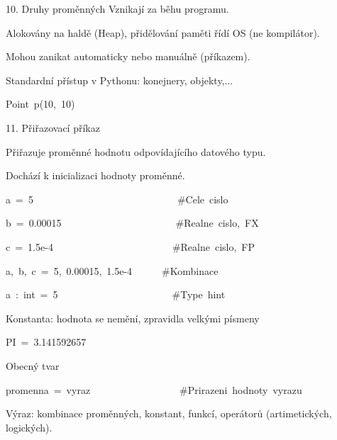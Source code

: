 \documentclass[czech]{beamer}
\newenvironment{lyxcode}
  {\par\begin{list}{}{
    \setlength{\rightmargin}{\leftmargin}
    \setlength{\listparindent}{0pt}%
    \raggedright
    \setlength{\itemsep}{0pt}
    \setlength{\parsep}{0pt}
    \normalfont\ttfamily}%
   \def\{{\char`\{}
   \def\}{\char`\}}
   \def\textasciitilde{\char`\~}
   \item[]}
  {\end{list}}
\begin{document}
\begin{frame}[plain]{10. Druhy proměnných}
{\tiny Vznikají za běhu programu.}{\tiny\par}

{\tiny Alokovány na haldě (Heap), přidělování paměti řídí OS (ne kompilátor). }{\tiny\par}

{\tiny Mohou zanikat automaticky nebo manuálně (příkazem).}{\tiny\par}

{\tiny Standardní přístup v Pythonu: konejnery, objekty,...}{\tiny\par}
\begin{lyxcode}
{\tiny Point~p(10,~10)}{\tiny\par}
\end{lyxcode}
\end{frame}

\begin{frame}{11. Přiřazovací příkaz}

{\tiny Přiřazuje proměnné hodnotu odpovídajícího datového typu.}{\tiny\par}

{\tiny Dochází k inicializaci hodnoty proměnné.}{\tiny\par}
\begin{lyxcode}
{\tiny a~=~5~~~~~~~~~~~~~~~~~~~~~~~~~~~~~\#Cele~cislo}{\tiny\par}

{\tiny b~=~0.00015~~~~~~~~~~~~~~~~~~~~~~~\#Realne~cislo,~FX}{\tiny\par}

{\tiny c~=~1.5e-4~~~~~~~~~~~~~~~~~~~~~~~~\#Realne~cislo,~FP}{\tiny\par}

{\tiny a,~b,~c~=~5,~0.00015,~1.5e-4~~~~~~\#Kombinace}{\tiny\par}

{\tiny a~:~int~=~5~~~~~~~~~~~~~~~~~~~~~~~\#Type~hint}{\tiny\par}
\end{lyxcode}
{\tiny Konstanta: hodnota se nemění, zpravidla velkými písmeny}{\tiny\par}
\begin{lyxcode}
{\tiny PI~=~3.141592657}{\tiny\par}
\end{lyxcode}
{\tiny Obecný tvar}{\tiny\par}
\begin{lyxcode}
{\tiny promenna~=~vyraz~~~~~~~~~~~~~~~~~~\#Prirazeni~hodnoty~vyrazu}{\tiny\par}
\end{lyxcode}
{\tiny Výraz: kombinace proměnných, konstant, funkcí, operátorů (artimetických,
logických).\medskip{}
}{\tiny\par}


\end{frame}
\end{document}
